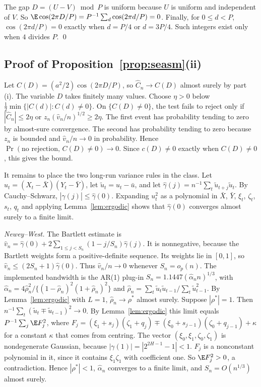 The gap $D=(U-V)\bmod P$ is uniform because $U$ is uniform and independent of $V$. So $\E\cos(2\pi D/P)=P^{-1}\sum_d\cos(2\pi d/P)=0$. Finally, for $0\le d<P$, $\cos(2\pi d/P)=0$ exactly when $d=P/4$ or $d=3P/4$. Such integers exist only when $4$ divides $P$. \qed

\subsection{Proof of Proposition~\ref{prop:seasm}(ii)}
Let $C(D)=(a^2/2)\cos(2\pi D/P)$, so $\hat C_n\to C(D)$ almost surely by part (i). The variable $D$ takes finitely many values. Choose $\eta>0$ below $\tfrac12\min\{|C(d)|:C(d)\ne0\}$. On $\{C(D)\ne0\}$, the test fails to reject only if $|\hat C_n|\le2\eta$ or $z_n(\hat v_n/n)^{1/2}\geq 2\eta$. The first event has probability tending to zero by almost-sure convergence. The second has probability tending to zero because $z_n$ is bounded and $\hat v_n/n\to0$ in probability. Hence $\Pr(\text{no rejection},\,C(D)\ne0)\to0$. Since $c(D)\ne0$ exactly when $C(D)\ne0$, this gives the bound.

It remains to place the two long-run variance rules in the class. Let $u_t=(X_t-\bar X)(Y_t-\bar Y)$, let $\tilde u_t=u_t-\bar u$, and let $\hat\gamma(j)=n^{-1}\sum_{t}\tilde u_{t+j}\tilde u_t$. By Cauchy--Schwarz, $|\hat\gamma(j)|\le\hat\gamma(0)$. Expanding $u_t^2$ as a polynomial in $\bar X$, $\bar Y$, $\xi_t$, $\zeta_t$, $s_t$, $q_t$ and applying Lemma~\ref{lem:ergodic} shows that $\hat\gamma(0)$ converges almost surely to a finite limit.

\emph{Newey--West.} The Bartlett estimate is $\hat v_n=\hat\gamma(0)+2\sum_{1\le j<S_n}(1-j/S_n)\hat\gamma(j)$. It is nonnegative, because the Bartlett weights form a positive-definite sequence. Its weights lie in $[0,1]$, so $\hat v_n\le(2S_n+1)\hat\gamma(0)$. Thus $\hat v_n/n\to0$ whenever $S_n=o_p(n)$. The implemented bandwidth is the \citet{andrews1991hac} AR(1) plug-in $S_n=1.1447(\hat\alpha_n n)^{1/3}$, with $\hat\alpha_n=4\hat\rho_n^2/\{(1-\hat\rho_n)^2(1+\hat\rho_n)^2\}$ and $\hat\rho_n=\sum_t\tilde u_t\tilde u_{t-1}/\sum_t\tilde u_{t-1}^2$. By Lemma~\ref{lem:ergodic} with $L=1$, $\hat\rho_n\to\rho^*$ almost surely. Suppose $|\rho^*|=1$. Then $n^{-1}\sum_t(\tilde u_t\mp\tilde u_{t-1})^2\to0$. By Lemma~\ref{lem:ergodic} this limit equals $P^{-1}\sum_j\E F_j^2$, where $F_j=(\xi_1+s_j)(\zeta_1+q_j)\mp(\xi_0+s_{j-1})(\zeta_0+q_{j-1})+\kappa$ for a constant $\kappa$ that comes from centring. The vector $(\xi_0,\xi_1,\zeta_0,\zeta_1)$ is nondegenerate Gaussian, because $|\gamma(1)|=|2^{2H-1}-1|<1$. $F_j$ is a nonconstant polynomial in it, since it contains $\xi_1\zeta_1$ with coefficient one. So $\E F_j^2>0$, a contradiction. Hence $|\rho^*|<1$, $\hat\alpha_n$ converges to a finite limit, and $S_n=O(n^{1/3})$ almost surely.

